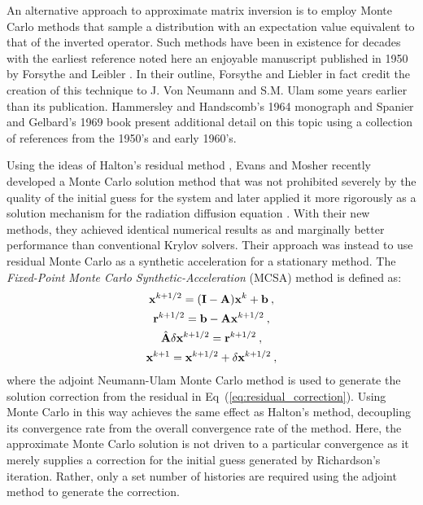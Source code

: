 \documentclass[letterpaper,10pt]{article}
\begin{document}
An alternative approach to approximate matrix inversion is to employ
Monte Carlo methods that sample a distribution with an expectation
value equivalent to that of the inverted operator. Such methods have
been in existence for decades with the earliest reference noted here
an enjoyable manuscript published in 1950 by Forsythe and Leibler
\cite{forsythe_matrix_1950}. In their outline, Forsythe and Liebler in
fact credit the creation of this technique to J. Von Neumann and
S.M. Ulam some years earlier than its publication. Hammersley and
Handscomb's 1964 monograph \cite{hammersley_monte_1964} and Spanier
and Gelbard's 1969 book \cite{spanier_monte_1969} present additional
detail on this topic using a collection of references from the 1950's
and early 1960's.

Using the ideas of Halton's residual method
\cite{halton_sequential_1994}, Evans and Mosher recently developed a
Monte Carlo solution method that was not prohibited severely by the
quality of the initial guess for the system \cite{evans_monte_2009}
and later applied it more rigorously as a solution mechanism for the
radiation diffusion equation \cite{evans_monte_2012}. With their new
methods, they achieved identical numerical results as and marginally
better performance than conventional Krylov solvers. Their approach
was instead to use residual Monte Carlo as a synthetic acceleration
for a stationary method. The \textit{Fixed-Point Monte Carlo
  Synthetic-Acceleration} (MCSA) method is defined as:
\begin{subequations}
  \begin{gather}
    \mathbf{x}^{k+1/2} = (\mathbf{I} - \mathbf{A})\mathbf{x}^k + \mathbf{b}\:,\\
    \mathbf{r}^{k+1/2} = \mathbf{b} - \mathbf{A}\mathbf{x}^{k+1/2}\:,\\
    \hat{\mathbf{A}}\delta\mathbf{x}^{k+1/2} = \mathbf{r}^{k+1/2}\:,
    \label{eq:residual_correction}\\
    \mathbf{x}^{k+1} = \mathbf{x}^{k+1/2} + \delta \mathbf{x}^{k+1/2}\:,
  \end{gather}
  \label{eq:mcsa}
\end{subequations}
where the adjoint Neumann-Ulam Monte Carlo method is used to generate
the solution correction from the residual in
Eq~(\ref{eq:residual_correction}). Using Monte Carlo in this way
achieves the same effect as Halton's method, decoupling its
convergence rate from the overall convergence rate of the
method. Here, the approximate Monte Carlo solution is not driven to a
particular convergence as it merely supplies a correction for the
initial guess generated by Richardson's iteration. Rather, only a set
number of histories are required using the adjoint method to generate
the correction.
\end{document}
